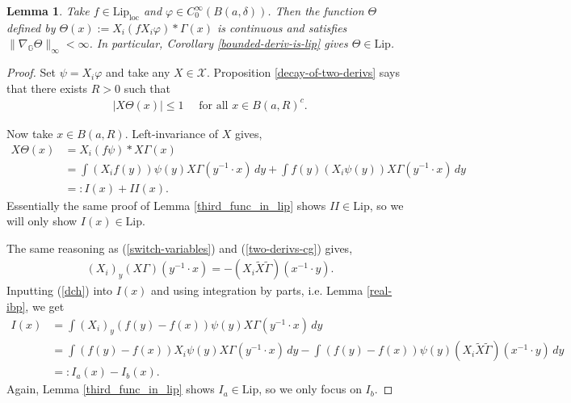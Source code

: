 \documentclass[12pt,a4paper,reqno]{amsart}
\newcommand{\wt}{\widetilde}
\newcommand{\cg}{\Gamma}
\renewcommand{\L}{\mathcal{L}}
\newcommand{\G}{\mathbb{G}}
\numberwithin{equation}{section}
\newtheorem{lem}[thm]{Lemma}
\theoremstyle{definition}
\begin{document}
\begin{lem}\label{second_func_in_lip}
Take $f\in \text{Lip}_{\text{loc}}$ and $\varphi \in C_0^{\infty}(B(a,\delta))$. Then the function $\Theta$ defined by $\Theta(x) := X_i(f X_i \varphi) \ast \cg(x)$ is continuous and satisfies $\| \nabla_{\G} \Theta \|_{\infty} < \infty$. In particular, Corollary \ref{bounded-deriv-is-lip} gives $\Theta \in \text{Lip}$.  
\end{lem}
\begin{proof}
Set $\psi = X_i \varphi$ and take any $X \in \mathcal{X}$.
Proposition \ref{decay-of-two-derivs} says that there exists $R > 0$ such that \begin{align}
    |X \Theta(x)| \leq 1 \quad \text{ for all }x \in B(a, R)^c. \label{decay-ball}
\end{align}

Now take $x \in B(a,R)$. Left-invariance of $X$ gives, \begin{align*}
X\Theta (x) &= X_i(f \psi) \ast X \cg(x) \\ &= \int (X_if(y))\psi(y) X \cg(y^{-1}\cdot x)\,dy + \int f(y)(X_i \psi(y)) X\cg(y^{-1}\cdot x)\,dy \\ &=: I(x)+II(x).
\end{align*}
Essentially the same proof of Lemma \ref{third_func_in_lip} shows $II \in \text{Lip}$, so we will only show $I(x) \in \text{Lip}$. 

The same reasoning as (\ref{switch-variables}) and (\ref{two-derivs-cg}) gives, \begin{align}
    (X_i)_y (X \cg)(y^{-1}\cdot x) = - (X_i \wt{X}\wt{\cg})(x^{-1}\cdot y). \label{dch}
\end{align}
 Inputting (\ref{dch}) into $I(x)$ and using integration by parts, i.e. Lemma \ref{real-ibp}, we get \begin{align*}
I(x) &= \int (X_i)_y(f(y)-f(x)) \psi(y) X \cg(y^{-1}\cdot x)\,dy
\\ &=\int (f(y) -f(x)) X_i \psi(y) X\cg(y^{-1}\cdot x) \,dy - \int (f(y) -f(x))\psi(y)(X_i \wt{X}\wt{\cg})(x^{-1} \cdot y)\,dy \\ &=: I_a(x) - I_b(x).
\end{align*}
 Again, Lemma \ref{third_func_in_lip} shows $I_a \in \text{Lip}$, so we only focus on $I_b$.


\end{proof}
\end{document}
